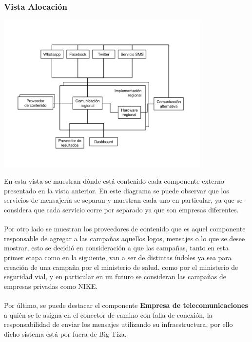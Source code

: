 \documentclass[a4paper, 11pt]{article}
\begin{document}
\newpage
\subsubsection{Vista Alocación}

\centerline{\includegraphics[width=0.8\textwidth]{./diagramas/VistaAlocacion.png}}

En esta vista se muestran dónde está contenido cada componente externo presentado en la vista anterior. En este diagrama se puede observar que los servicios de mensajería se separan y muestran cada uno en particular, ya que se considera que cada servicio corre por separado ya que son empresas diferentes.\\
\\
Por otro lado se muestran los proveedores de contenido que es aquel componente responsable de agregar a las campañas aquellos logos, mensajes o lo que se desee mostrar, esto se decidió en consideración a que las campañas, tanto en esta primer etapa como en la siguiente, van a ser de distintas índoles ya sea para creación de una campaña por el ministerio de salud, como por el ministerio de seguridad vial, y en particular en un futuro se consideran las campañas de empresas privadas como NIKE.\\
\\
Por último, se puede destacar el componente \textbf{Empresa de telecomunicaciones} a quién se le asigna en el conector de camino con falla de conexión, la responsabilidad de enviar los mensajes utilizando su infraestructura, por ello dicho sistema está por fuera de Big Tiza.


\newpage


\newpage



%
%

\newpage


\end{document}

